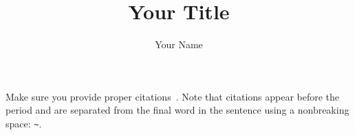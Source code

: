 \documentclass{article}
\title{Your Title}
\author{Your Name}
\begin{document}
\maketitle

Make sure you provide proper citations~\cite{assignment-description}. Note
that citations appear before the period and are separated from the final word
in the sentence using a nonbreaking space: \verb!~!.



\end{document}
